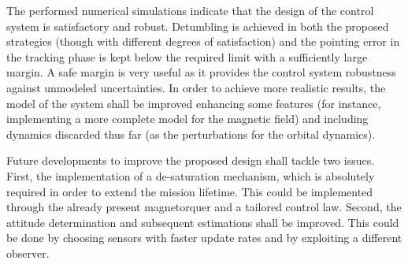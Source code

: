The performed numerical simulations indicate that the design of the control system is satisfactory and robust. Detumbling is achieved in both the proposed strategies (though with different degrees of satisfaction) and the pointing error in the tracking phase is kept below the required limit with a sufficiently large margin. A safe margin is very useful as it provides the control system robustness against unmodeled uncertainties. In order to achieve more realistic results, the model of the system shall be improved enhancing some features (for instance, implementing a more complete model for the magnetic field) and including dynamics discarded thus far (as the perturbations for the orbital dynamics).

Future developments to improve the proposed design shall tackle two issues. First, the implementation of a de-saturation mechanism, which is absolutely required in order to extend the mission lifetime. This could be implemented through the already present magnetorquer and a tailored control law. Second, the attitude determination and subsequent estimations shall be improved. This could be done by choosing sensors with faster update rates and by exploiting a different observer.


